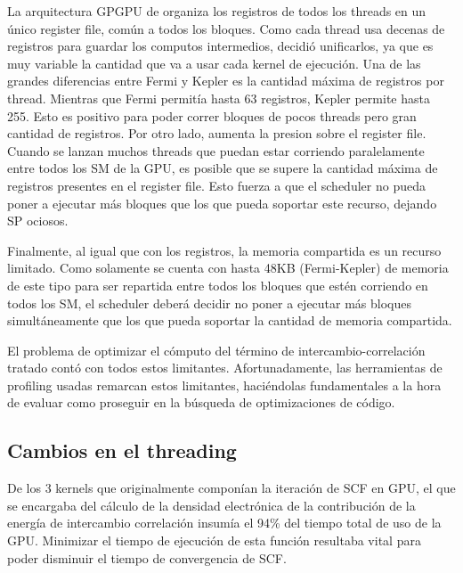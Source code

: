 La arquitectura GPGPU de \nvidia organiza los registros de todos los threads en un \'unico
register file, com\'un a todos los bloques. Como cada thread usa decenas de registros para guardar
los computos intermedios, \nvidia decidi\'o unificarlos, ya que es muy variable la cantidad que va a usar
cada kernel de ejecuci\'on. Una de las grandes diferencias entre Fermi y Kepler es la cantidad m\'axima de
registros por thread. Mientras que Fermi permit\'ia hasta 63 registros, Kepler permite hasta 255. Esto
es positivo para poder correr bloques de pocos threads pero gran cantidad de registros. Por otro lado,
aumenta la presion sobre el register file. Cuando se lanzan muchos threads
que puedan estar corriendo paralelamente entre todos los SM de la GPU, es posible que se supere
la cantidad m\'axima de registros presentes en el register file. Esto fuerza a que el scheduler
no pueda poner a ejecutar m\'as bloques que los que pueda soportar este recurso, dejando SP ociosos.

Finalmente, al igual que con los registros, la memoria compartida es un recurso limitado. Como
solamente se cuenta con hasta 48KB (Fermi-Kepler) de memoria de este tipo para ser repartida entre
todos los bloques que est\'en corriendo en todos los SM, el scheduler deber\'a decidir no poner a ejecutar
m\'as bloques simult\'aneamente que los que pueda soportar la cantidad de memoria compartida.

El problema de optimizar el c\'omputo del t\'ermino de intercambio-correlaci\'on tratado  cont\'o
con todos estos limitantes. Afortunadamente,
las herramientas de profiling usadas remarcan estos limitantes, haci\'endolas
fundamentales a la hora de evaluar como proseguir en la b\'usqueda de optimizaciones de c\'odigo.

\subsection{Cambios en el threading}

De los 3 kernels que originalmente compon\'ian la iteraci\'on de SCF en GPU, el que se encargaba
del c\'alculo de la densidad electr\'onica de la contribuci\'on de la energ\'ia de intercambio correlaci\'on
insum\'ia el 94\% del tiempo total de uso de la GPU. Minimizar el tiempo de ejecuci\'on de
esta funci\'on resultaba vital para poder disminuir el tiempo de convergencia de SCF.

